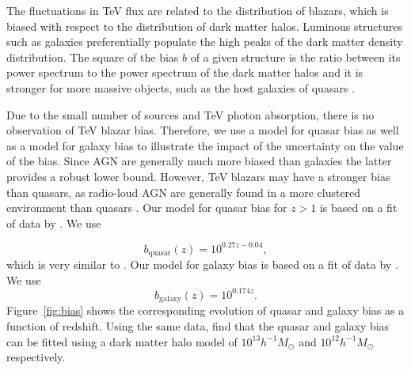 \documentclass[numberedappendix]{emulateapj}
\newcommand\Cc[1]{{\color{blue} \bf #1}} %
\begin{document}
The fluctuations in TeV flux are related to the distribution of blazars, which is biased with respect to the distribution of dark matter halos. Luminous structures such as galaxies preferentially populate the high peaks of the dark matter density distribution. The square of the bias $b$ of a given structure is the ratio between its power spectrum to the power spectrum of the dark matter halos and it is stronger for more massive objects, such as the host galaxies of quasars \citep[see, e.g.][for a review]{2002PhR...372....1C}.

Due to the small number of sources and TeV photon absorption, there is no observation of TeV blazar bias.  Therefore, we  use a model for quasar bias as well as a model for galaxy bias to illustrate the impact of the uncertainty on the value of the bias. Since AGN are generally much more biased than galaxies the latter provides a robust lower bound. However, TeV blazars may have a stronger bias than quasars, as radio-loud AGN are generally found in a more clustered environment than quasars \citep{2009MNRAS.393..377M,2012MNRAS.421.3060S}. Our model for quasar  bias for $z>1$ is based on a fit of data by \citet{2005MNRAS.356..415C,2007ApJ...658...85M,2007AJ....133.2222S}. We use

  \begin{equation}
    \label{eq:gal_bias}
    b_{\mathrm{quasar}}(z)=10^{0.27z-0.04},
  \end{equation}
which is very similar to \citet{2012MNRAS.422..106P}. Our model for galaxy bias is based on a fit of data by \citet{2005A&A...442..801M,1998ApJ...492..428S,2006ApJ...637..631K}. We use
  \begin{equation}
    \label{eq:qso_bias}
    b_{\mathrm{galaxy}}(z)=10^{0.174z}.
  \end{equation}
Figure~\ref{fig:bias} shows the corresponding evolution of quasar and galaxy bias as a function of redshift. Using the same data, \citet{2008ApJ...678..627B} find that the quasar and galaxy bias can be fitted using a dark matter halo model of  $10^{13}h^{-1}M_{\odot}$ and $10^{12}h^{-1} M_{\odot}$ respectively. 

\end{document}
